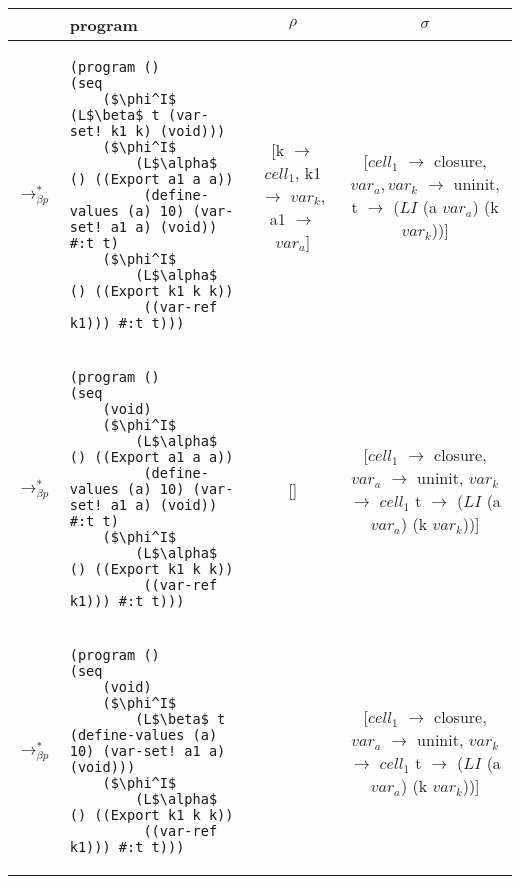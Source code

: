 \begin{table}[!htbp]
  \footnotesize
  \begin{tabular}{l >{\centering\arraybackslash}m{} >{\scriptsize}c >{\scriptsize}c}  %
	&\textbf{program} & \textbf{$\rho$} & \textbf{$\sigma$} \\ \hline \hline
	$\longrightarrow_{\beta p}^*$&\begin{lstlisting}[style=numberless]
(program ()
(seq
	($\phi^I$ (L$\beta$ t (var-set! k1 k) (void)))
	($\phi^I$
		(L$\alpha$ () ((Export a1 a a))
		 (define-values (a) 10) (var-set! a1 a) (void)) #:t t)
	($\phi^I$
		(L$\alpha$ () ((Export k1 k k))
		 ((var-ref k1))) #:t t)))\end{lstlisting} & \thead{[k $\rightarrow$ $cell_1$,\\k1 $\rightarrow$ $var_k$,\\a1 $\rightarrow$ $var_a$]} & \thead{[$cell_1$ $\rightarrow$ closure,\\$var_a,var_k$ $\rightarrow$ uninit,\\t $\rightarrow$ ($LI$\\(a $var_a$) (k $var_k$))]} \\ \hline
	$\longrightarrow_{\beta p}^*$&\begin{lstlisting}[style=numberless]
(program ()
(seq
	(void)
	($\phi^I$
		(L$\alpha$ () ((Export a1 a a))
		 (define-values (a) 10) (var-set! a1 a) (void)) #:t t)
	($\phi^I$
		(L$\alpha$ () ((Export k1 k k))
		 ((var-ref k1))) #:t t)))\end{lstlisting} & [] & \thead{[$cell_1$ $\rightarrow$ closure,\\$var_a$ $\rightarrow$ uninit,\\$var_k$ $\rightarrow$ $cell_1$\\t $\rightarrow$ ($LI$\\(a $var_a$) (k $var_k$))]} \\ \hline
	$\longrightarrow_{\beta p}^*$&\begin{lstlisting}[style=numberless]
(program ()
(seq
	(void)
	($\phi^I$
		(L$\beta$ t (define-values (a) 10) (var-set! a1 a) (void)))
	($\phi^I$
		(L$\alpha$ () ((Export k1 k k))
		 ((var-ref k1))) #:t t)))\end{lstlisting} & \thead{[a1 $\rightarrow$ $var_a$]} & \thead{[$cell_1$ $\rightarrow$ closure,\\$var_a$ $\rightarrow$ uninit,\\$var_k$ $\rightarrow$ $cell_1$\\t $\rightarrow$ ($LI$\\(a $var_a$) (k $var_k$))]} \\ \hline

\end{tabular}
\end{table}
